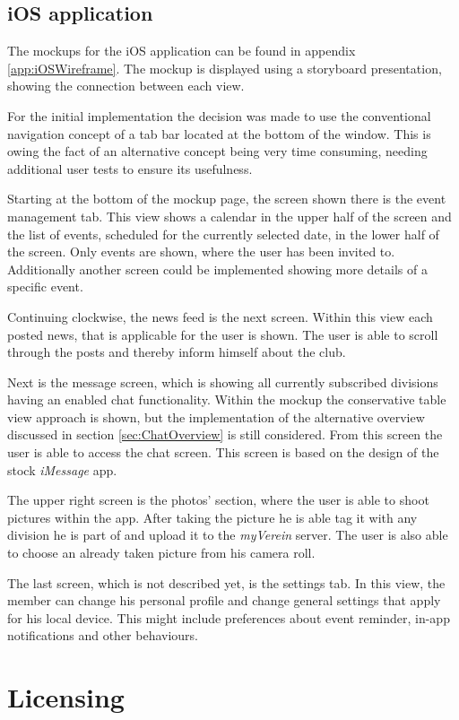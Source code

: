 \subsection{iOS application}
\label{sec:iOSMockup}
The mockups for the iOS application can be found in appendix \vref{app:iOSWireframe}. The mockup is displayed using a storyboard presentation, showing the connection between each view.

For the initial implementation the decision was made to use the conventional navigation concept of a tab bar located at the bottom of the window. This is owing the fact of an alternative concept being very time consuming, needing additional user tests to ensure its usefulness.

Starting at the bottom of the mockup page, the screen shown there is the event management tab. This view shows a calendar in the upper half of the screen and the list of events, scheduled for the currently selected date, in the lower half of the screen. Only events are shown, where the user has been invited to. Additionally another screen could be implemented showing more details of a specific event.

Continuing clockwise, the news feed is the next screen. Within this view each posted news, that is applicable for the user is shown. The user is able to scroll through the posts and thereby inform himself about the club.

Next is the message screen, which is showing all currently subscribed divisions having an enabled chat functionality. Within the mockup the conservative table view approach is shown, but the implementation of the alternative overview discussed in section \vref{sec:ChatOverview} is still considered. From this screen the user is able to access the chat screen. This screen is based on the design of the stock \emph{iMessage} app.

The upper right screen is the photos' section, where the user is able to shoot pictures within the app. After taking the picture he is able tag it with any division he is part of and upload it to the \emph{myVerein} server. The user is also able to choose an already taken picture from his camera roll.

The last screen, which is not described yet, is the settings tab. In this view, the member can change his personal profile and change general settings that apply for his local device. This might include preferences about event reminder, in-app notifications and other behaviours.

\section{Licensing}

